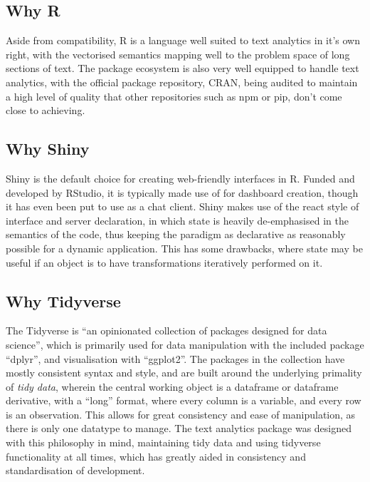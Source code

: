 \message{ !name(jason-cairns-dissertation.tex)}\documentclass[11pt, a4paper, titlepage]{report}
\begin{document}
\subsection{Why R}

Aside from compatibility, R is a language well suited to text
analytics in it's own right, with the vectorised semantics mapping
well to the problem space of long sections of text. The package
ecosystem is also very well equipped to handle text analytics, with
the official package repository, CRAN, being audited to maintain a
high level of quality that other repositories such as npm or pip,
don't come close to achieving.

\subsection{Why Shiny}

Shiny is the default choice for creating web-friendly interfaces in R.
Funded and developed by RStudio, it is typically made use of for
dashboard creation, though it has even been put to use as a chat
client. Shiny makes use of the react style of interface and server
declaration, in which state is heavily de-emphasised in the semantics
of the code, thus keeping the paradigm as declarative as reasonably
possible for a dynamic application. This has some drawbacks, where
state may be useful if an object is to have transformations
iteratively performed on it.

\subsection{Why Tidyverse}\label{sec:why-tidyverse}

The Tidyverse is ``an opinionated collection of packages designed for
data science'', which is primarily used for data manipulation with the
included package ``dplyr''\autocite{wickham19dpl}, and visualisation
with ``ggplot2''. The packages in the collection have mostly
consistent syntax and style, and are built around the underlying
primality of \textit{tidy data}, wherein the central working object is
a dataframe or dataframe derivative, with a ``long'' format, where
every column is a variable, and every row is an
observation\autocite{wickham2014tidy}. This allows for great
consistency and ease of manipulation, as there is only one datatype to
manage. The text analytics package was designed with this philosophy
in mind, maintaining tidy data and using tidyverse functionality at
all times, which has greatly aided in consistency and standardisation
of development.
\end{document}
